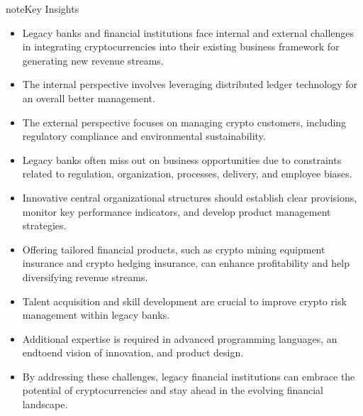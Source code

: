 \documentclass[letterpaper,10pt,english]{jupyterBook}
\begin{document}
\begin{sphinxadmonition}{note}{Key Insights}
\begin{itemize}
\item {} 
\sphinxAtStartPar
Legacy banks and financial institutions face internal and external challenges in integrating cryptocurrencies into their existing business framework for generating new revenue streams.

\item {} 
\sphinxAtStartPar
The internal perspective involves leveraging distributed ledger technology for an overall better management.

\item {} 
\sphinxAtStartPar
The external perspective focuses on managing crypto customers, including regulatory compliance and environmental sustainability.

\item {} 
\sphinxAtStartPar
Legacy banks often miss out on business opportunities due to constraints related to regulation, organization, processes, delivery, and employee biases.

\item {} 
\sphinxAtStartPar
Innovative central organizational structures should establish clear provisions, monitor key performance indicators, and develop product management strategies.

\item {} 
\sphinxAtStartPar
Offering tailored financial products, such as crypto mining equipment insurance and crypto hedging insurance, can enhance profitability and help diversifying revenue streams.

\item {} 
\sphinxAtStartPar
Talent acquisition and skill development are crucial to improve crypto risk management within legacy banks.

\item {} 
\sphinxAtStartPar
Additional expertise is required in advanced programming languages, an end\sphinxhyphen{}to\sphinxhyphen{}end vision of innovation, and product design.

\item {} 
\sphinxAtStartPar
By addressing these challenges, legacy financial institutions can embrace the potential of cryptocurrencies and stay ahead in the evolving financial landscape.

\end{itemize}
\end{sphinxadmonition}
\end{document}
